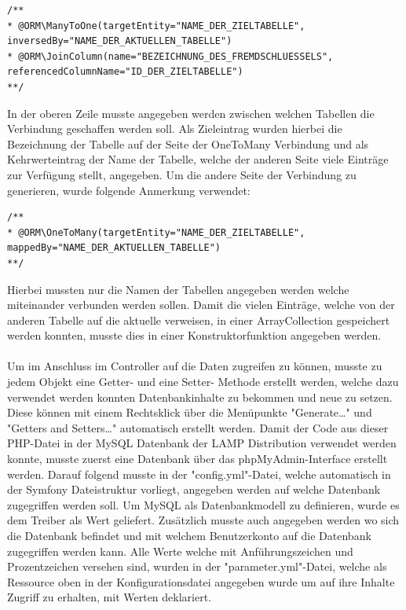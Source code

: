 	\lstset{language=php}
  	\begin{lstlisting}
/**
* @ORM\ManyToOne(targetEntity="NAME_DER_ZIELTABELLE", 
inversedBy="NAME_DER_AKTUELLEN_TABELLE")
* @ORM\JoinColumn(name="BEZEICHNUNG_DES_FREMDSCHLUESSELS", 
referencedColumnName="ID_DER_ZIELTABELLE")
**/
  	\end{lstlisting}
In der oberen Zeile musste angegeben werden zwischen welchen Tabellen die Verbindung geschaffen werden soll. Als Zieleintrag wurden hierbei die Bezeichnung der Tabelle auf der Seite der OneToMany Verbindung und als Kehrwerteintrag der Name der Tabelle, welche der anderen Seite viele Einträge zur Verfügung stellt, angegeben.
Um die andere Seite der Verbindung zu generieren, wurde folgende Anmerkung verwendet:
	
	\lstset{language=php}
  	\begin{lstlisting}
/**
* @ORM\OneToMany(targetEntity="NAME_DER_ZIELTABELLE", 
mappedBy="NAME_DER_AKTUELLEN_TABELLE")
**/
  	\end{lstlisting}
Hierbei mussten nur die Namen der Tabellen angegeben werden welche miteinander verbunden werden sollen. Damit die vielen Einträge, welche von der anderen Tabelle auf die aktuelle verweisen, in einer ArrayCollection gespeichert werden konnten, musste dies in einer Konstruktorfunktion angegeben werden.
\\ \\
Um im Anschluss im Controller auf die Daten zugreifen zu können, musste zu jedem Objekt eine Getter- und eine Setter- Methode erstellt werden, welche dazu verwendet werden konnten Datenbankinhalte zu bekommen und neue zu setzen. Diese können mit einem Rechtsklick über die Menüpunkte "Generate…" und "Getters and Setters…" automatisch erstellt werden.
Damit der Code aus dieser PHP-Datei in der MySQL Datenbank der LAMP Distribution verwendet werden konnte, musste zuerst eine Datenbank über das phpMyAdmin-Interface erstellt werden. Darauf folgend musste in der "config.yml"-Datei, welche automatisch in der Symfony Dateistruktur vorliegt, angegeben werden auf welche Datenbank zugegriffen werden soll.
Um MySQL als Datenbankmodell zu definieren, wurde es dem Treiber als Wert geliefert. Zusätzlich musste auch angegeben werden wo sich die Datenbank befindet und mit welchem Benutzerkonto auf die Datenbank zugegriffen werden kann.
Alle Werte welche mit Anführungszeichen und Prozentzeichen versehen sind, wurden in der "parameter.yml"-Datei, welche als Ressource oben in der Konfigurationsdatei angegeben wurde um auf ihre Inhalte Zugriff zu erhalten, mit Werten deklariert.
